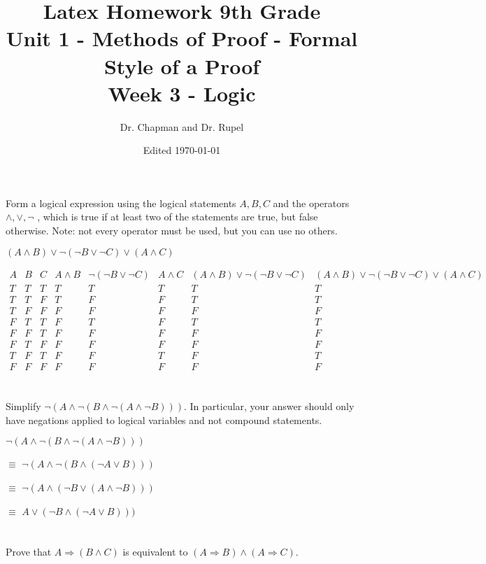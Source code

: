 \documentclass{article}
\title{Latex Homework 9th Grade\\ Unit 1 - Methods of Proof - Formal Style of a Proof\\ Week 3 - Logic}
\author{Dr. Chapman and Dr. Rupel}
\date{Edited \today}
\begin{document}
\maketitle

\section{}
    Form a logical expression using the logical statements \(A,B,C\) and the operators \(\wedge,\vee,\neg\) , which is true if at least two of the statements are true, but false otherwise. Note: not every operator must be used, but you can use no others.

$(A\land B)\lor\neg(\neg B \lor \neg C)\lor(A \land C)$


$\begin{array}{c|c|c|c|c|c|c|c}A&B&C& A\land B& \neg(\neg B\lor \neg C)&A\land C&(A\land B)\lor\neg(\neg B\lor\neg C)&(A\land B)\lor\neg(\neg B\lor\neg C)\lor(A\land C)\\
\hline T&T&T&T&T&T&T&T \\ \hline T&T&F&T&F&F&T&T \\ \hline T&F&F&F&F&F&F&F \\ \hline F&T&T&F&T&F&T&T \\ \hline F&F&T&F&F&F&F&F
\\ \hline F&T&F&F&F&F&F&F \\ \hline T&F&T&F&F&T&F&T \\ \hline F&F&F&F&F&F&F&F
\end{array}$


\section{}
    Simplify \(\neg(A\wedge\neg(B\wedge\neg(A\wedge\neg B)))\). In particular, your answer should only have negations applied to logical variables and not compound statements.
    \begin{steps}
    \item \(\neg(A\wedge\neg(B\wedge\neg(A\wedge\neg B)))\) 
    \item $\equiv$ \(\neg(A\wedge\neg(B\wedge(\neg A\vee B)))\) 
    \item $\equiv$ \(\neg(A\wedge(\neg B\vee(A \wedge \neg B)))\) 
    \item $\equiv$ \(A\vee(\neg B\wedge(\neg A\vee B)))\) 
   \end{steps}
   \section{}
    Prove that \(A\Rightarrow(B\wedge C)\) is equivalent to \((A\Rightarrow B)\wedge(A\Rightarrow C)\).
    
\end{document}
